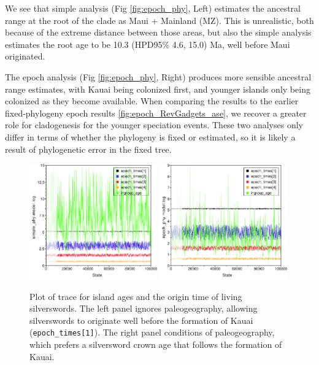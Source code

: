 We see that simple analysis (Fig \ref{fig:epoch_phy}, Left) estimates the ancestral range at the root of the clade as Maui + Mainland (MZ).
This is unrealistic, both because of the extreme distance between those areas, but also the simple analysis estimates the root age to be 10.3 (HPD95\% 4.6, 15.0) Ma, well before Maui originated.

The epoch analysis (Fig \ref{fig:epoch_phy}, Right) produces more sensible ancestral range estimates, with Kauai being colonized first, and younger islands only being colonized as they become available.
When comparing the results to the earlier fixed-phylogeny epoch results \ref{fig:epoch_RevGadgets_ase}, we recover a greater role for cladogenesis for the younger speciation events.
These two analyses only differ in terms of whether the phylogeny is fixed or estimated, so it is likely a result of phylogenetic error in the fixed tree.

\begin{figure}[!h]
\centering
\includegraphics[width=0.49\textwidth]{figures/fig_simple_ages.pdf} \includegraphics[width=0.49\textwidth]{figures/fig_epoch_ages.pdf} 

\caption{Plot of trace for island ages and the origin time of living silverswords. The left panel ignores paleogeography, allowing silverswords to originate well before the formation of Kauai ({\tt epoch\_times[1]}). The right panel conditions of paleogeography, which prefers a silversword crown age that follows the formation of Kauai.}
\label{fig:epoch_ages}
\end{figure}


